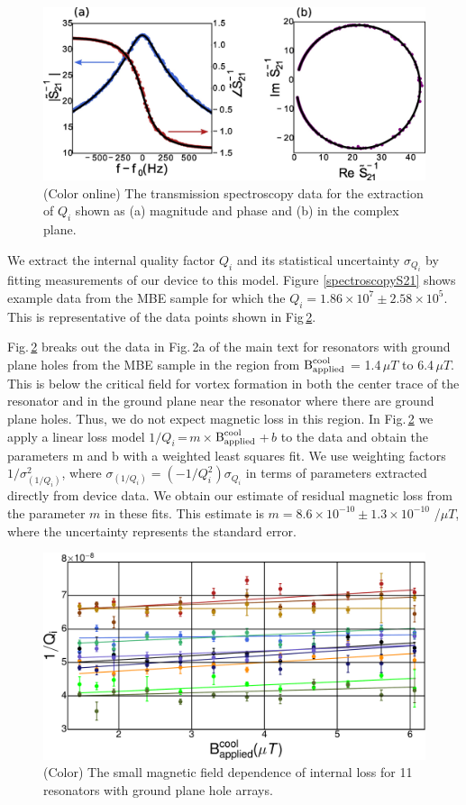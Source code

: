 \documentclass[aip,jap,reprint,nobalancelastpage]{revtex4-1}
\begin{document}
\begin{figure}[b]
\begin{center}
\includegraphics[width=240 pt]{DielectricFluxTrap_Supp_Rev2_basicfit.jpg}
\caption{(Color online)  The transmission spectroscopy data for the extraction of $Q_{i}$ shown as (a) magnitude and phase and (b) in the complex plane.}
\label{basicfit}
\end{center}
\end{figure}

We extract the internal quality factor $Q_{i}$ and its statistical uncertainty $\sigma_{Q_{i}}$ by fitting measurements of our device to this model.  Figure \ref{spectroscopyS21} shows example data from the MBE sample for which the $Q_{i} = 1.86 \times 10^{7} \pm 2.58 \times 10^{5}$.  This is representative of the data points shown in Fig\,\ref{novortexdata}.

Fig.\,\ref{novortexdata} breaks out the data in Fig.\,2a of the main text for resonators with ground plane holes from the MBE sample in the region from $\text{B}^{\text{cool}}_{\text{applied}}$ = 1.4\,$\mu T$ to 6.4\,$\mu T$.  This is below the critical field for vortex formation in both the center trace of the resonator and in the ground plane near the resonator where there are ground plane holes.  Thus, we do not expect magnetic loss in this region.  In Fig.\,\ref{novortexdata} we apply a linear loss model $1/Q_{i}$\,=\,$m$\,$\times$\,$\text{B}^{\text{cool}}_{\text{applied}}$\,+\,$b$ to the data and obtain the parameters m and b with a weighted least squares fit.  We use weighting factors $1/\sigma^2_{\left( 1/Q_i \right)}$, where $\sigma_{\left( 1/Q_i \right)}=\left( -1/Q_{i}^{2} \right) \sigma_{Q_{i}}$ in terms of parameters extracted directly from device data.  We obtain our estimate of residual magnetic loss from the parameter $m$ in these fits.  This estimate is $m = 8.6\times10^{-10} \pm 1.3\times 10^{-10}$ /$\mu T$, where the uncertainty represents the standard error.


\setlength{\textfloatsep}{0pt}
\begin{figure}
\begin{center}
\includegraphics[width=230 pt]{DielectricFluxTrap_Supp_Rev2_qnovortex.pdf}
\caption{(Color)  The small magnetic field dependence of internal loss for 11 resonators with ground plane hole arrays.}
\label{novortexdata}
\end{center}
\end{figure}
\end{document}
